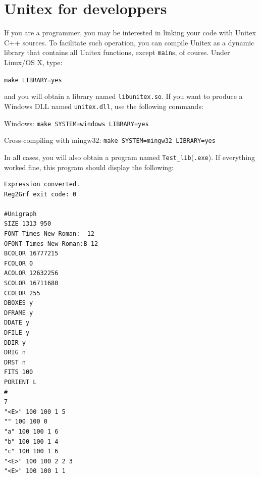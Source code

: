 \section{Unitex for developpers}
\label{section-unitex-developpers}
If you are a programmer, you may be interested in linking your code with Unitex
C++ sources. To facilitate such operation, you can compile Unitex as a
dynamic library that contains all Unitex functions, except \verb+main+s, of
course. Under Linux/OS X, type:

\bigskip
\verb+make LIBRARY=yes+

\bigskip
\noindent and you will obtain a library named \verb+libunitex.so+. If you want
to produce a Windows DLL named \verb+unitex.dll+, use the following commands:

\bigskip
Windows: \verb+make SYSTEM=windows LIBRARY=yes+

Cross-compiling with mingw32: \verb+make SYSTEM=mingw32 LIBRARY=yes+

\bigskip
\noindent In all cases, you will also obtain a program named
\verb+Test_lib+(\verb+.exe+). If everything worked fine, this program should 
display the following:

\begin{verbatim}
Expression converted.
Reg2Grf exit code: 0

#Unigraph
SIZE 1313 950
FONT Times New Roman:  12
OFONT Times New Roman:B 12
BCOLOR 16777215
FCOLOR 0
ACOLOR 12632256
SCOLOR 16711680
CCOLOR 255
DBOXES y
DFRAME y
DDATE y
DFILE y
DDIR y
DRIG n
DRST n
FITS 100
PORIENT L
#
7
"<E>" 100 100 1 5
"" 100 100 0
"a" 100 100 1 6
"b" 100 100 1 4
"c" 100 100 1 6
"<E>" 100 100 2 2 3
"<E>" 100 100 1 1
\end{verbatim}
